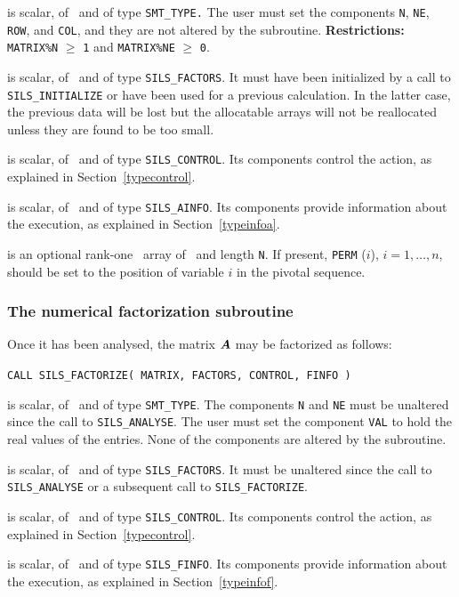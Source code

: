 \documentclass{galahad}
\newcommand{\packagename}{SILS}
\begin{document}
\begin{description}
 is scalar, of \intentin\ and of type 
{\tt SMT\_TYPE.}  
The user must set the components {\tt N}, {\tt NE}, {\tt ROW}, 
and {\tt COL}, and they are not altered by the subroutine. 
 {\bf Restrictions:} 
 {\tt MATRIX\%N} $\geq$ {\tt 1} and {\tt MATRIX\%NE} $\geq$ {\tt 0}. 
  
 is scalar, of \intentinout\ and of type 
{\tt \packagename\_FACTORS}. It must have been initialized by a call to 
{\tt \packagename\_INI\-TIALIZE} or have been used for a previous calculation. 
In the latter case, the previous data will be lost but the allocatable 
arrays will not be reallocated unless they are found to be too small. 
 
 is scalar, of \intentin\ and of type 
{\tt \packagename\_CONTROL}. Its components control the action, as explained in 
Section~\ref{typecontrol}. 
 
 is scalar, of \intentout\ and of type {\tt \packagename\_AINFO}. 
Its components provide information about the execution, as explained in 
Section~\ref{typeinfoa}. 
 
 is an optional rank-one \integer\ array of \intentin\
and length {\tt N}.
If present, {\tt PERM} ($i$), $i = 1, \ldots, n$, should be set 
to the position of  variable $i$ in the pivotal sequence. 
  
\end{description}


\subsubsection{The numerical factorization subroutine}
Once it has been analysed, the matrix ${\bm{A}}$ may be factorized as follows:

\hskip0.5in 
{\tt CALL \packagename\_FACTORIZE( MATRIX, FACTORS, CONTROL, FINFO )}

\begin{description}

 is scalar, of \intentin\ and of type {\tt SMT\_TYPE}.  The 
components {\tt N} and {\tt NE} must be unaltered since the call 
to {\tt \packagename\_ANALYSE}. The user must set the component {\tt VAL} 
to hold the real values of the entries. None of the components are altered 
by the subroutine. 
 
 is scalar, of \intentinout\ and of type 
{\tt \packagename\_FACTORS}. It must be unaltered since the call 
to {\tt \packagename\_ANALYSE} or a subsequent call to 
{\tt \packagename\_FACTORIZE}. 
 
 is scalar, of \intentin\ and of type 
{\tt \packagename\_CONTROL}. Its components control the action, as explained in 
Section~\ref{typecontrol}. 
 
 is scalar, of \intentout\ and of type {\tt \packagename\_FINFO}. 
Its components provide information about the execution, as explained in 
Section~\ref{typeinfof}. 

\end{description}
\end{document}
